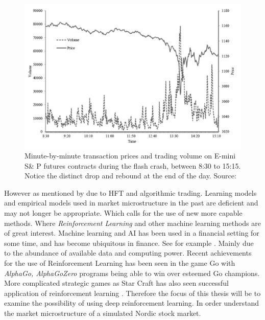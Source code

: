 \documentclass{kththesis}
\theoremstyle{definition}
\begin{document}
\begin{figure}[ht]
    \centering
    \includegraphics[scale=.7]{flashcrash.PNG}
    \caption{Minute-by-minute transaction prices and trading volume on E-mini S\& P futures contracts during the flash crash, between 8:30 to 15:15. Notice the distinct drop and rebound at the end of the day. Source: \textcite{kirilenko2017flash} }
    \label{fig:1}
\end{figure}

However as mentioned by \textcite{o2015high} due to HFT and algorithmic trading. Learning models and empirical models used in market microstructure in the past are deficient and may not longer be appropriate. Which calls for the use of new more capable methods. Where \textit{Reinforcement Learning} and other machine learning methods are of great interest. Machine learning and AI has been used in a financial setting for some time, and has become ubiquitous in finance. See for example \parencite{moody1999reinforcement, wang2016reinforcement, dempster2006automated, du2016algorithm, bertoluzzo2012testing, casqueiro2006neuro}. Mainly due to the abundance of available data and computing power. 
\newline
\newline
Recent achievements for the use of Reinforcement Learning has been seen in the game Go with \textit{AlphaGo, AlphaGoZero} \parencite{silver2016mastering} programs being able to win over esteemed Go champions. More complicated strategic games as Star Craft has also seen successful application of reinforcement learning \parencite{vinyals2017starcraft}. Therefore the focus of this thesis will be to examine the possibility of using deep reinforcement learning. In order understand the market microstructure of a simulated Nordic stock market.
\end{document}
